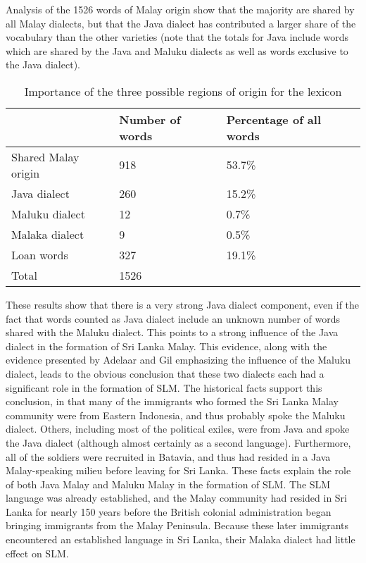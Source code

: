 Analysis of the 1526 words of Malay origin show that the majority are shared by all Malay dialects, but that the Java dialect has contributed a larger share of the vocabulary than the other varieties (note that the totals for Java include words which are shared by the Java and Maluku dialects as well as words exclusive to the Java dialect).

\begin{table}
\centering
\begin{tabular}{lll}
 &
\textbf{Number of words} &
\textbf{Percentage of all words}\\\hline
Shared Malay origin &
918 &
53.7\%\\
Java dialect &
260 &
15.2\%\\
Maluku dialect &
12 &
0.7\%\\
Malaka dialect &
9 &
0.5\%\\
Loan words\footnotemark{} &
327 &
19.1\%\\\hline
\multicolumn{1}{l}{Total} &
\multicolumn{1}{l}{1526} &
\\
\end{tabular}
\caption{Importance of the three possible regions of origin for the lexicon}
\label{paauw:tab:detailedoriginoflexemes}
\end{table}

These results show that there is a very strong Java dialect component, even if the fact that words counted as Java dialect include an unknown number of words shared with the Maluku dialect. This points to a strong influence of the Java dialect in the formation of Sri Lanka Malay. This evidence, along with the evidence presented by Adelaar and Gil emphasizing the influence of the Maluku dialect, leads to the obvious conclusion that these two dialects each had a significant role in the formation of SLM. The historical facts support this conclusion, in that many of the immigrants who formed the Sri Lanka Malay community were from Eastern Indonesia, and thus probably spoke the Maluku dialect. Others, including most of the political exiles, were from Java and spoke the Java dialect (although almost certainly as a second language). Furthermore, all of the soldiers were recruited in Batavia, and thus had resided in a Java Malay-speaking milieu before leaving for Sri Lanka. These facts explain the role of both Java Malay and Maluku Malay in the formation of SLM. The SLM language was already established, and the Malay community had resided in Sri Lanka for nearly 150 years before the British colonial administration began bringing immigrants from the Malay Peninsula. Because these later immigrants encountered an established language in Sri Lanka, their Malaka dialect had little effect on SLM.

